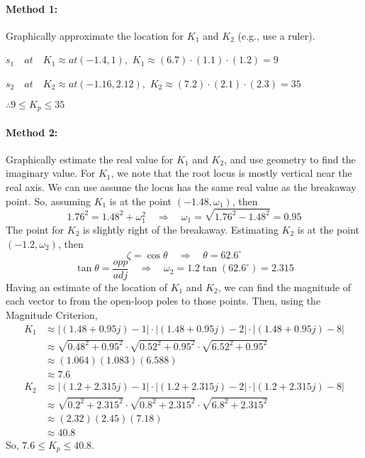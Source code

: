 \documentclass{book}
\begin{document}
\paragraph{Method 1:} Graphically approximate the location for $ K_1 $ and $ K_2 $ (e.g., use a ruler).

$s_1 \quad at \quad K_1 \approx at (-1.4,1),$
$K_1 \approx (6.7)\cdot(1.1)\cdot(1.2) = 9$

$s_2 \quad at \quad K_2 \approx at (-1.16, 2.12),$
$K_2 \approx (7.2)\cdot(2.1)\cdot(2.3) = 35$

$\therefore 9 \leq K_p \leq 35$

\paragraph{Method 2:}  Graphically estimate the real value for $ K_1 $ and $ K_2 $, and use geometry to find the imaginary value. For $ K_1 $, we note that the root locus is mostly vertical near the real axis. We can use assume the locus has the same real value as the breakaway point. So, assuming $ K_1 $ is at the point $ (-1.48,\omega_1) $, then
\[ 1.76^2 = 1.48^2 + \omega_1^2 \quad\Rightarrow\quad \omega_1 = \sqrt{1.76^2-1.48^2} = 0.95 \]
The point for $ K_2 $ is slightly right of the breakaway. Estimating $ K_2 $ is at the point $ (-1.2,\omega_2) $, then
\[ \zeta = \cos\theta \quad\Rightarrow\quad \theta = 62.6^\circ \]
\[ \tan\theta = \frac{opp}{adj} \quad\Rightarrow\quad \omega_2 = 1.2\tan(62.6^\circ) = 2.315 \]
Having an estimate of the location of $ K_1 $ and $ K_2 $, we can find the magnitude of each vector to from the open-loop poles to those points. Then, using the Magnitude Criterion,
\begin{align*}
K_1 & \approx |(1.48+0.95j)-1|\cdot|(1.48+0.95j)-2|\cdot|(1.48+0.95j)-8|\\
&\approx \sqrt{0.48^2+0.95^2} \cdot \sqrt{0.52^2+0.95^2} \cdot \sqrt{6.52^2+0.95^2}\\
&\approx (1.064)(1.083)(6.588)\\
&\approx 7.6
\end{align*}
\begin{align*}
K_2 & \approx |(1.2+2.315j)-1|\cdot|(1.2+2.315j)-2|\cdot|(1.2+2.315j)-8|\\
&\approx \sqrt{0.2^2+2.315^2} \cdot \sqrt{0.8^2+2.315^2} \cdot \sqrt{6.8^2+2.315^2}\\
&\approx (2.32)(2.45)(7.18)\\
&\approx 40.8
\end{align*}
So, $ 7.6 \leq K_p \leq 40.8 $.
\end{document}
